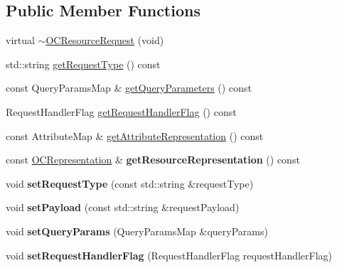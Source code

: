 \subsection*{Public Member Functions}
\begin{DoxyCompactItemize}
\item 
virtual \hyperlink{classOC_1_1OCResourceRequest_af2fa22dc6bf6888c1cee9cbf9dc14cce}{$\sim$\+O\+C\+Resource\+Request} (void)
\item 
std\+::string \hyperlink{classOC_1_1OCResourceRequest_ab27a4deeb51e8039f1ca8b478cbd8440}{get\+Request\+Type} () const 
\item 
const Query\+Params\+Map \& \hyperlink{classOC_1_1OCResourceRequest_acc294d625957fbeae3ca1cd8a116c34b}{get\+Query\+Parameters} () const 
\item 
Request\+Handler\+Flag \hyperlink{classOC_1_1OCResourceRequest_a3db5684a64a20c7d7bbf648d7bcbd511}{get\+Request\+Handler\+Flag} () const 
\item 
const Attribute\+Map \& \hyperlink{classOC_1_1OCResourceRequest_ad08cd672748a7cd4fa1a7ceb8ef6abca}{get\+Attribute\+Representation} () const 
\item 
\hypertarget{classOC_1_1OCResourceRequest_a0f270c5c32afa64284f6e68bea61b350}{}const \hyperlink{classOC_1_1OCRepresentation}{O\+C\+Representation} \& {\bfseries get\+Resource\+Representation} () const \label{classOC_1_1OCResourceRequest_a0f270c5c32afa64284f6e68bea61b350}

\item 
\hypertarget{classOC_1_1OCResourceRequest_a07b269420d60dca8c0835a29c67d378e}{}void {\bfseries set\+Request\+Type} (const std\+::string \&request\+Type)\label{classOC_1_1OCResourceRequest_a07b269420d60dca8c0835a29c67d378e}

\item 
\hypertarget{classOC_1_1OCResourceRequest_a9f006f0707201b5c4def61c3a83b130a}{}void {\bfseries set\+Payload} (const std\+::string \&request\+Payload)\label{classOC_1_1OCResourceRequest_a9f006f0707201b5c4def61c3a83b130a}

\item 
\hypertarget{classOC_1_1OCResourceRequest_ae1d1738dacce9026d1b0502986e1739c}{}void {\bfseries set\+Query\+Params} (Query\+Params\+Map \&query\+Params)\label{classOC_1_1OCResourceRequest_ae1d1738dacce9026d1b0502986e1739c}

\item 
\hypertarget{classOC_1_1OCResourceRequest_a638843dd0adff94bea892f219a5285a1}{}void {\bfseries set\+Request\+Handler\+Flag} (Request\+Handler\+Flag request\+Handler\+Flag)\label{classOC_1_1OCResourceRequest_a638843dd0adff94bea892f219a5285a1}

\end{DoxyCompactItemize}


